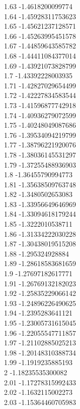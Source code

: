 {1.63	-1.4618200099774\\
1.64	-1.45928311753623\\
1.65	-1.45621237128571\\
1.66	-1.45263995451578\\
1.67	-1.44859643585782\\
1.68	-1.44411084377014\\
1.69	-1.43921073828799\\
1.7	-1.43392228003935\\
1.71	-1.42827029654499\\
1.72	-1.42227834583544\\
1.73	-1.41596877742918\\
1.74	-1.40936279072599\\
1.75	-1.40248049087686\\
1.76	-1.39534094219799\\
1.77	-1.38796221920076\\
1.78	-1.38036145531297\\
1.79	-1.37255488936903\\
1.8	-1.36455790994773\\
1.81	-1.35638509763748\\
1.82	-1.3480502653083\\
1.83	-1.33956649646969\\
1.84	-1.33094618179244\\
1.85	-1.3222010538711\\
1.86	-1.31334222030228\\
1.87	-1.30438019515208\\
1.88	-1.295324928884\\
1.89	-1.28618583681659\\
1.9	-1.27697182617771\\
1.91	-1.26769132182023\\
1.92	-1.25835229066142\\
1.93	-1.24896226490625\\
1.94	-1.2395283641121\\
1.95	-1.23005731615045\\
1.96	-1.22055547711857\\
1.97	-1.21102885025213\\
1.98	-1.20148310388734\\
1.99	-1.1919235885193\\
2	-1.18235535300082\\
2.01	-1.17278315992433\\
2.02	-1.1632115002273\\
2.03	-1.15364460705983\\
}

